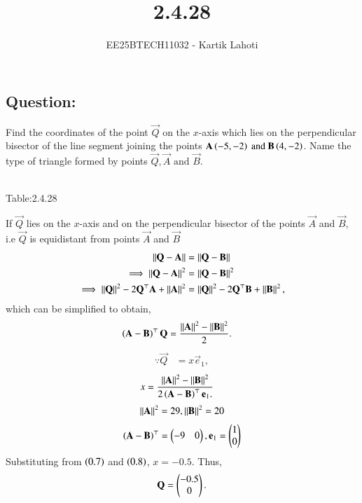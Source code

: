 \documentclass[journal]{IEEEtran}
\numberwithin{equation}{enumi}
\numberwithin{figure}{enumi}
\begin{document}

\vspace{3cm}

\title{2.4.28}
\author{EE25BTECH11032 - Kartik Lahoti}
\maketitle

\subsection*{Question: } 
Find the coordinates of the point $\vec{Q}$ on the $x$-axis which lies on the perpendicular bisector of the line segment joining the points $\mathbf{A} \left(-5,-2\right) \text{ and } \mathbf{B} \left(4,-2\right)$. Name the type of triangle formed by points $\vec{Q}, \vec{A} \text{ and } \vec{B}$.\\
\solution \\ 

\begin{table}[H]
\centering

\caption*{Table:2.4.28}
\label{Table:2.4.28}	
\end{table}
%
  If $\vec{Q}$ lies on the  $x$-axis and on the perpendicular bisector of the points $\vec{A}$ and $\vec{B}$, i.e $\vec{Q}$ is equidistant from points $\vec{A}$ and $\vec{B}$
\begin{align}
 \left\lVert\mathbf{Q}-\mathbf{A}\right\rVert &=
\left\lVert\mathbf{Q}-\mathbf{B}\right\rVert 
\\
 \implies \left\lVert\mathbf{Q}-\mathbf{A}\right\rVert^2 &=
\left\lVert\mathbf{Q}-\mathbf{B}\right\rVert^2 
\\
 \implies \left\lVert\mathbf{Q}\right\rVert^2-2{\mathbf{Q}}^{\top}\mathbf{A} + \left\lVert\mathbf{A}\right\rVert^2
	&= \left\lVert\mathbf{Q}\right\rVert^2-2{\mathbf{Q}}^{\top}\mathbf{B} + \left\lVert\mathbf{B}\right\rVert^2,
\end{align}
which can be simplified to obtain, 
  \begin{align}
	  \left(\mathbf{A}-\mathbf{B}\right)^\top   \mathbf{Q}&=\frac{\left\lVert\mathbf{A}\right\rVert^2 -\left\lVert\mathbf{B}\right\rVert^2 }{2}.
  \end{align}
  \begin{align}
  \because \vec{Q} &= x\vec{e}_1,
  \end{align}
  \begin{align}
   x &=\frac{\left\lVert\mathbf{A}\right\rVert^2 -\left\lVert\mathbf{B}\right\rVert^2 }{2\left(\mathbf{A}-\mathbf{B}\right)^{\top }\mathbf{e}_1.}
  \end{align}
  \begin{align}
      \left\lVert\mathbf{A}\right\rVert^2 = 29 , \left\lVert\mathbf{B}\right\rVert^2 = 20   
  \end{align}
    \begin{align}
        \left(\mathbf{A}-\mathbf{B}\right)^{\top} = \begin{pmatrix}-9 & 0 \end{pmatrix} , \mathbf{e}_1 = \begin{pmatrix}1 \\ 0\end{pmatrix} 
    \end{align}
    Substituting from $\left(0.7\right)$ and $\left(0.8\right)$,
 $x =  -0.5$.  Thus, 
		\begin{align}
        \mathbf{Q} = \begin{pmatrix}-0.5 \\ 0\end{pmatrix}.
		\end{align}
		
\end{document}
